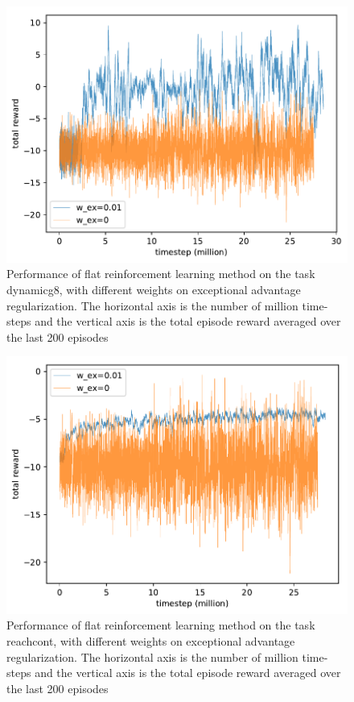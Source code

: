 \begin{figure}[!htbp]
	\includegraphics[width=\textwidth]{images/rec_180719_baseline_dynamicg8.pdf}
	\centering
	\caption{Performance of flat reinforcement learning method on the task dynamicg8, with different weights on exceptional advantage regularization. The horizontal axis is the number of million time-steps and the vertical axis is the total episode reward averaged over the last 200 episodes}\label{rec_basline_dynamicg8}
\end{figure}

\begin{figure}[!htbp]
	\includegraphics[width=\textwidth]{images/rec_180718_basiline_reachcont.pdf}
	\centering
	\caption{Performance of flat reinforcement learning method on the task reachcont, with different weights on exceptional advantage regularization. The horizontal axis is the number of million time-steps and the vertical axis is the total episode reward averaged over the last 200 episodes}\label{rec_basline_reachcont}
\end{figure}


